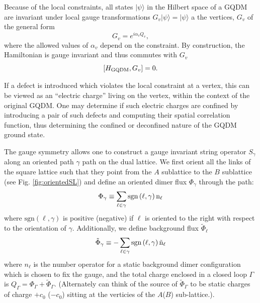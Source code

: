 \documentclass[twocolumn,prb,aps,floatfix,superscriptaddress]{revtex4-1}
\newcommand{\figref}[1]{Fig. \ref{#1}}
\newcommand{\ket}[1]{| #1 \rangle}
\begin{document}
Because of the local constraints, all states $\ket{\psi}$ in the Hilbert space of a GQDM are invariant under local gauge transformations $G_v \ket{\psi} = \ket{\psi}$ a the vertices, $G_v$ of the general form~\cite{Moessner2001}
\begin{equation}
G_v = e^{i \alpha_v Q_v}, \label{eq:Gv}
\end{equation}
where the allowed values of $\alpha_v$ depend on the constraint.  
By construction, the Hamiltonian is gauge invariant and thus commutes with $G_v$
\begin{equation}
\left[ H_{\rm{GQDM}}, G_v \right] = 0. \notag
\end{equation}

If a defect is introduced which violates the local constraint at a vertex, this can be viewed as an ``electric charge'' living on the vertex, within the context of the original GQDM. 
One may determine if such electric charges are confined by introducing a pair of such defects and computing their spatial correlation function, thus determining the confined or deconfined nature of the GQDM ground state.

The gauge symmetry allows one to construct a gauge invariant string operator $S_\gamma$ along an oriented path $\gamma$ path on the dual lattice. We first orient all the links of the square lattice such that they point from the $A$ sublattice to the $B$ sublattice (see \figref{fig:orientedSL}) and define an oriented dimer flux $\Phi_\gamma$ through the path:
\begin{equation}
\Phi_\gamma \equiv \sum_{\ell \in \gamma} \rm{sgn}\left(\ell,\gamma\right) n_\ell \label{eq:phi}
\end{equation}
where $\mathrm{sgn}(\ell,\gamma)$ is positive (negative) if $\ell$ is oriented to the right with respect to the orientation of $\gamma$. Additionally, we define background flux $\tilde{\Phi}_\ell$
\begin{equation}
\tilde{\Phi}_\gamma \equiv - \sum_{\ell \in \gamma} \rm{sgn}\left(\ell,\gamma\right) \tilde{n}_\ell \label{eq:phiBackground}
\end{equation}
where $n_\ell$ is the number operator for a static background dimer configuration which is chosen to fix the gauge, and the total charge enclosed in a closed loop $\Gamma$ is $Q_\Gamma = \Phi_\Gamma+ \tilde{\Phi}_\Gamma$. (Alternately can think of the source of $\tilde{\Phi}_\Gamma$ to be static charges of charge $+c_0$ ($-c_0$) sitting at the verticies of the $A$($B$) sub-lattice.).
\end{document}
